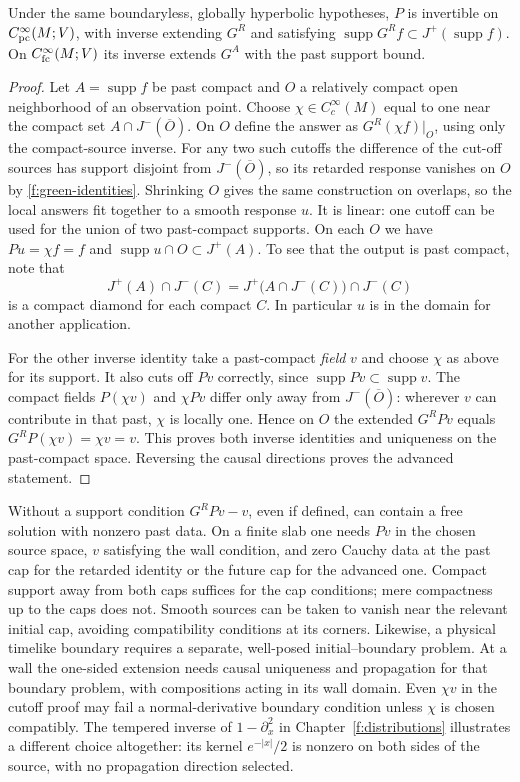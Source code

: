 \begin{proposition}\label{f:one-sided-extension}
Under the same boundaryless, globally hyperbolic hypotheses, $P$ is invertible on $C^\infty_{\rm pc}(M;V)$, with inverse extending $G^R$ and satisfying $\operatorname{supp}G^R f\subset J^+(\operatorname{supp}f)$. On $C^\infty_{\rm fc}(M;V)$ its inverse extends $G^A$ with the past support bound.
\end{proposition}
\begin{proof}
Let $A=\operatorname{supp}f$ be past compact and $O$ a relatively compact open neighborhood of an observation point. Choose $\chi\in C_c^\infty(M)$ equal to one near the compact set $A\cap J^-(\overline O)$. On $O$ define the answer as $G^R(\chi f)|_O$, using only the compact-source inverse. For any two such cutoffs the difference of the cut-off sources has support disjoint from $J^-(\overline O)$, so its retarded response vanishes on $O$ by \eqref{f:green-identities}. Shrinking $O$ gives the same construction on overlaps, so the local answers fit together to a smooth response $u$. It is linear: one cutoff can be used for the union of two past-compact supports. On each $O$ we have $Pu=\chi f=f$ and $\operatorname{supp}u\cap O\subset J^+(A)$. To see that the output is past compact, note that
\[
 J^+(A)\cap J^-(C)=J^+\big(A\cap J^-(C)\big)\cap J^-(C)
\]
is a compact diamond for each compact $C$. In particular $u$ is in the domain for another application.

For the other inverse identity take a past-compact \emph{field} $v$ and choose $\chi$ as above for its support. It also cuts off $Pv$ correctly, since $\operatorname{supp}Pv\subset\operatorname{supp}v$. The compact fields $P(\chi v)$ and $\chi Pv$ differ only away from $J^-(\overline O)$: wherever $v$ can contribute in that past, $\chi$ is locally one. Hence on $O$ the extended $G^R Pv$ equals $G^R P(\chi v)=\chi v=v$. This proves both inverse identities and uniqueness on the past-compact space. Reversing the causal directions proves the advanced statement.
\end{proof}

Without a support condition $G^RPv-v$, even if defined, can contain a free solution with nonzero past data. On a finite slab one needs $Pv$ in the chosen source space, $v$ satisfying the wall condition, and zero Cauchy data at the past cap for the retarded identity or the future cap for the advanced one. Compact support away from both caps suffices for the cap conditions; mere compactness up to the caps does not. Smooth sources can be taken to vanish near the relevant initial cap, avoiding compatibility conditions at its corners. Likewise, a physical timelike boundary requires a separate, well-posed initial--boundary problem. At a wall the one-sided extension needs causal uniqueness and propagation for that boundary problem, with compositions acting in its wall domain. Even $\chi v$ in the cutoff proof may fail a normal-derivative boundary condition unless $\chi$ is chosen compatibly. The tempered inverse of $1-\partial_x^2$ in Chapter~\ref{f:distributions} illustrates a different choice altogether: its kernel $e^{-|x|}/2$ is nonzero on both sides of the source, with no propagation direction selected.

